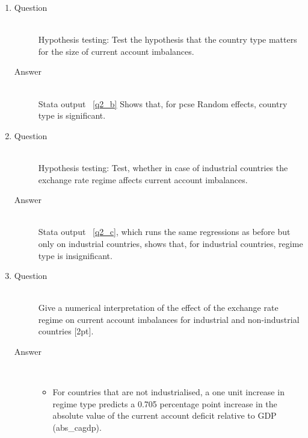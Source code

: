 \documentclass{article}
\begin{document}
\begin{enumerate}
\begin{enumerate}[label=(\alph*)]
    
    \item 
    \begin{description}
      \item[Question] \hfill \\
      Hypothesis testing: Test the hypothesis that the country type matters for the size of current account imbalances.
      \item[Answer] \hfill \\
      Stata output ~\ref{q2_b} Shows that, for pcse Random effects, country type is significant.
      \begin{figure}
      
      \end{figure}
    \end{description}
    
    \item 
    \begin{description}
      \item[Question] \hfill \\
      Hypothesis testing: Test, whether in case of industrial countries the exchange rate regime affects current account imbalances.
      \item[Answer] \hfill \\
      Stata output ~\ref{q2_c}, which runs the same regressions as before but only on industrial countries, shows that, for industrial countries, regime type is insignificant. 
      \begin{figure}
      
      \end{figure}
    \end{description}    
    
    \item 
    \begin{description}
      \item[Question] \hfill \\
      Give a numerical interpretation of the effect of the exchange rate regime on current account imbalances for industrial and non-industrial countries [2pt].
      \item[Answer] \hfill \\
      \begin{itemize}
      
      \item For countries that are not industrialised, a one unit increase in regime type predicts a 0.705 percentage point increase in the absolute value of the current account deficit relative to GDP (abs\_cagdp).
      

\end{itemize}
\end{description}
\end{enumerate}
\end{enumerate}
\end{document}
